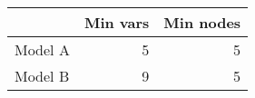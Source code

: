 
\begin{tabular}{l|r|r}
\hline
  & Min vars & Min nodes\\
\hline
Model A & 5 & 5\\
\hline
Model B & 9 & 5\\
\hline
\end{tabular}